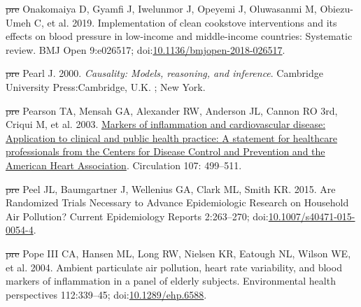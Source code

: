 \documentclass[
  letterpaper,
  DIV=11,
  numbers=noendperiod]{scrartcl}
\newlength{\cslhangindent}
\newenvironment{CSLReferences}[2] %
 {\begin{list}{}{%
  \setlength{\itemindent}{0pt} %
  \setlength{\leftmargin}{0pt} %
  \setlength{\parsep}{0pt} %
  \ifodd #1
   \setlength{\leftmargin}{\cslhangindent} %
   \setlength{\itemindent}{-1\cslhangindent} %
  \fi
  \setlength{\itemsep}{#2\baselineskip}}} %
 {\end{list}} %
\providecommand{\DIFdel}[1]{{\protect\color{red}\sout{#1}}}                      %
\providecommand{\DIFaddbegin}{} %
\providecommand{\DIFaddend}{} %
\providecommand{\DIFdelbegin}{} %
\providecommand{\DIFdelend}{} %
\newcommand{\DIFscaledelfig}{0.5}
\newlength{\DIFdelgraphicswidth} %
\newlength{\DIFdelgraphicsheight} %
\newcommand{\DIFaddincludegraphics}[2][]{{\color{blue}\fbox{\DIFOincludegraphics[#1]{#2}}}} %
\newcommand{\DIFdelincludegraphics}[2][]{%
\sbox{\DIFdelgraphicsbox}{\DIFOincludegraphics[#1]{#2}}%
\settoboxwidth{\DIFdelgraphicswidth}{\DIFdelgraphicsbox} %
\settoboxtotalheight{\DIFdelgraphicsheight}{\DIFdelgraphicsbox} %
\scalebox{\DIFscaledelfig}{%
\parbox[b]{\DIFdelgraphicswidth}{\usebox{\DIFdelgraphicsbox}\\[-\baselineskip] \rule{\DIFdelgraphicswidth}{0em}}\llap{\resizebox{\DIFdelgraphicswidth}{\DIFdelgraphicsheight}{%
\setlength{\unitlength}{\DIFdelgraphicswidth}%
\begin{picture}(1,1)%
\thicklines\linethickness{2pt} %
{\color[rgb]{1,0,0}\put(0,0){\framebox(1,1){}}}%
{\color[rgb]{1,0,0}\put(0,0){\line( 1,1){1}}}%
{\color[rgb]{1,0,0}\put(0,1){\line(1,-1){1}}}%
\end{picture}%
}\hspace*{3pt}}} %
} %
\DeclareRobustCommand{\DIFaddbegin}{\DIFOaddbegin \let\includegraphics\DIFaddincludegraphics} %
\DeclareRobustCommand{\DIFaddend}{\DIFOaddend \let\includegraphics\DIFOincludegraphics} %
\DeclareRobustCommand{\DIFdelbegin}{\DIFOdelbegin \let\includegraphics\DIFdelincludegraphics} %
\DeclareRobustCommand{\DIFdelend}{\DIFOaddend \let\includegraphics\DIFOincludegraphics} %
\begin{document}
\begin{CSLReferences}{1}{1}
\DIFdelbegin %
\DIFdel{pre}%
\DIFdelend \DIFaddbegin {}
\DIFaddend Onakomaiya D, Gyamfi J, Iwelunmor J, Opeyemi J, Oluwasanmi M,
Obiezu-Umeh C, et al. 2019. Implementation of clean cookstove
interventions and its effects on blood pressure in low-income and
middle-income countries: Systematic review. BMJ Open 9:e026517;
doi:\href{https://doi.org/10.1136/bmjopen-2018-026517}{10.1136/bmjopen-2018-026517}.

\DIFdelbegin %
\DIFdel{pre}%
\DIFdelend \DIFaddbegin {}
\DIFaddend Pearl J. 2000. \emph{Causality: Models, reasoning, and inference}.
Cambridge University Press:Cambridge, U.K. ; New York.

\DIFdelbegin %
\DIFdel{pre}%
\DIFdelend \DIFaddbegin {}
\DIFaddend Pearson TA, Mensah GA, Alexander RW, Anderson JL, Cannon RO 3rd, Criqui
M, et al. 2003.
\href{https://www.ncbi.nlm.nih.gov/pubmed/12551878}{Markers of
inflammation and cardiovascular disease: Application to clinical and
public health practice: {A} statement for healthcare professionals from
the {Centers} for {Disease Control} and {Prevention} and the {American
Heart Association}}. Circulation 107: 499--511.

\DIFdelbegin %
\DIFdel{pre}%
\DIFdelend \DIFaddbegin {}
\DIFaddend Peel JL, Baumgartner J, Wellenius GA, Clark ML, Smith KR. 2015. Are
{Randomized Trials Necessary} to {Advance Epidemiologic Research} on
{Household Air Pollution}? Current Epidemiology Reports 2:263--270;
doi:\href{https://doi.org/10.1007/s40471-015-0054-4}{10.1007/s40471-015-0054-4}.

\DIFdelbegin %
\DIFdel{pre}%
\DIFdelend \DIFaddbegin {}
\DIFaddend Pope III CA, Hansen ML, Long RW, Nielsen KR, Eatough NL, Wilson WE, et
al. 2004. Ambient particulate air pollution, heart rate variability, and
blood markers of inflammation in a panel of elderly subjects.
Environmental health perspectives 112:339--45;
doi:\href{https://doi.org/10.1289/ehp.6588}{10.1289/ehp.6588}.


\end{CSLReferences}
\end{document}
